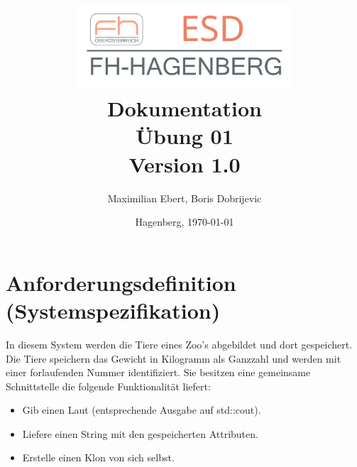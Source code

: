 \documentclass[12pt,naustrian,a4widepaper]{scrartcl}
\begin{document}


\title {\vspace{1cm}
       \includegraphics[width=8cm]{./Images/esd}\\
       \vspace{2cm}
       {\textbf{Dokumentation\\Übung 01}}\\
       \vspace{5mm}
       {\small{Version 1.0}}\\
       \vspace{5mm}
}

\author{\small{Maximilian Ebert, Boris Dobrijevic}}
\date  {\small{Hagenberg, \today}}
\maketitle





\clearpage

\tableofcontents
\clearpage

\section{Anforderungsdefinition (Systemspezifikation)}

In diesem System werden die Tiere eines Zoo's abgebildet und dort gespeichert. Die Tiere speichern das Gewicht in Kilogramm als Ganzzahl und werden mit einer forlaufenden Nummer identifiziert. Sie besitzen eine gemeinsame Schnittstelle die folgende Funktionalität liefert:
\begin{itemize}
	\item Gib einen Laut (entsprechende Ausgabe auf std::cout).
	\item Liefere einen String mit den gespeicherten Attributen.
	\item Erstelle einen Klon von sich selbst.
\end{itemize}
\end{document}
